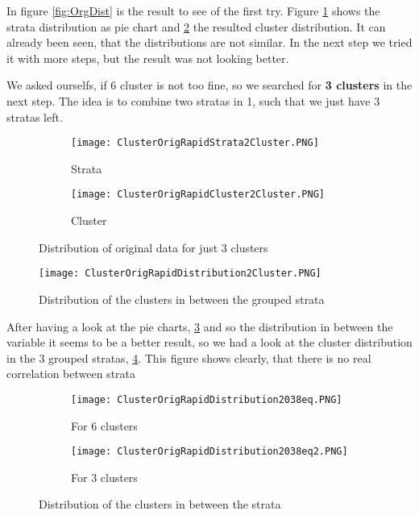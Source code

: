 In figure \ref{fig:OrgDist} is the result to see of the first try. Figure \ref{fig:OrgSt} shows the strata distribution as pie chart and \ref{fig:OrgCl} the resulted cluster distribution. It can already been seen, that the distributions are not similar. In the next step we tried it with more steps, but the result was not looking better.

We asked ourselfs, if 6 cluster is not too fine, so we searched for \textbf{3 clusters} in the next step. The idea is to combine two stratas in 1, such that we just have 3 stratas left.
\begin{figure}[!htbp]
\centering
\begin{subfigure}{.5\textwidth}
  \centering
  \texttt{[image: ClusterOrigRapidStrata2Cluster.PNG]}
  \caption{Strata}
  \label{fig:OrgSt}
\end{subfigure}%
\begin{subfigure}{.5\textwidth}
  \centering
  \texttt{[image: ClusterOrigRapidCluster2Cluster.PNG]}
  \caption{Cluster}
  \label{fig:OrgCl}
\end{subfigure}
\caption{Distribution of original data for just 3 clusters}
\label{fig:OrgDist3Cl}
\end{figure}

\begin{figure}[!htbp]
\centering
\texttt{[image: ClusterOrigRapidDistribution2Cluster.PNG]}
\caption{Distribution of the clusters in between the grouped strata}
\label{fig:Groupdist}
\end{figure}

After having a look at the pie charts, \ref{fig:OrgDist3Cl} and so the distribution in between the variable it seems to be a better result, so we had a look at the cluster distribution in the 3 grouped stratas, \ref{fig:Groupdist}. This figure shows clearly, that there is no real correlation between strata 

\begin{figure}[!htbp]
\centering
\begin{subfigure}{0.9\textwidth}
\texttt{[image: ClusterOrigRapidDistribution2038eq.PNG]}
\caption{For 6 clusters}
\label{fig:2038_6}
\end{subfigure}
\begin{subfigure}{0.9\textwidth}
\texttt{[image: ClusterOrigRapidDistribution2038eq2.PNG]}
\caption{For 3 clusters}
\label{fig:2038_3}
\end{subfigure}
\caption{Distribution of the clusters in between the strata}
\label{fig:2038_Clust}
\end{figure}

